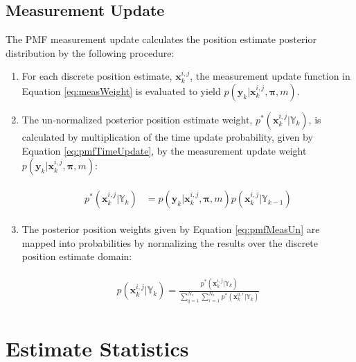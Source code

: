 \subsection{Measurement Update}
\label{framework.PMF.Measurement}

The PMF measurement update calculates the position estimate posterior distribution by the following procedure:

 \begin{enumerate}
 
 \item For each discrete position estimate, $\mathbf{x}_k^{i,j}$, the measurement update function in Equation \ref{eq:measWeight} is evaluated to yield $p(\mathbf{y}_k | \mathbf{x}_k^{i,j}, \mathbf{\pi}, m)$. 
 
 \item The un-normalized posterior position estimate weight, $p^{*}(\mathbf{x}_k^{i,j} | \mathbb{Y}_k)$, is calculated by multiplication of the time update probability, given by Equation \ref{eq:pmfTimeUpdate}, by the measurement update weight $p(\mathbf{y}_k | \mathbf{x}_k^{i,j}, \mathbf{\pi}, m)$:
 
 \begin{align}
 \begin{split}
 p^{*}(\mathbf{x}_k^{i,j} | \mathbb{Y}_k) &= p(\mathbf{y}_k | \mathbf{x}_k^{i,j}, \mathbf{\pi}, m) p(\mathbf{x}_k^{i,j} | \mathbb{Y}_{k-1}) 
 \end{split}
 \label{eq:pmfMeasUn}
 \end{align}
 
 \item The posterior position weights given by Equation \ref{eq:pmfMeasUn} are mapped into probabilities by normalizing the results over the discrete position estimate domain:
 
 \begin{align}
 \begin{split}
 p(\mathbf{x}_k^{i,j} | \mathbb{Y}_k) = \frac{p^{*}(\mathbf{x}_k^{i,j} | \mathbb{Y}_k)}{\sum_{q=1}^{N_e} \sum_{r=1}^{N_n} p^{*}(\mathbf{x}_k^{q,r} | \mathbb{Y}_k)}
 \end{split}
 \label{eq:pmfMeasNormalize}
 \end{align}
 
 \end{enumerate}

\section{Estimate Statistics}
\label{framework.Statistics}


